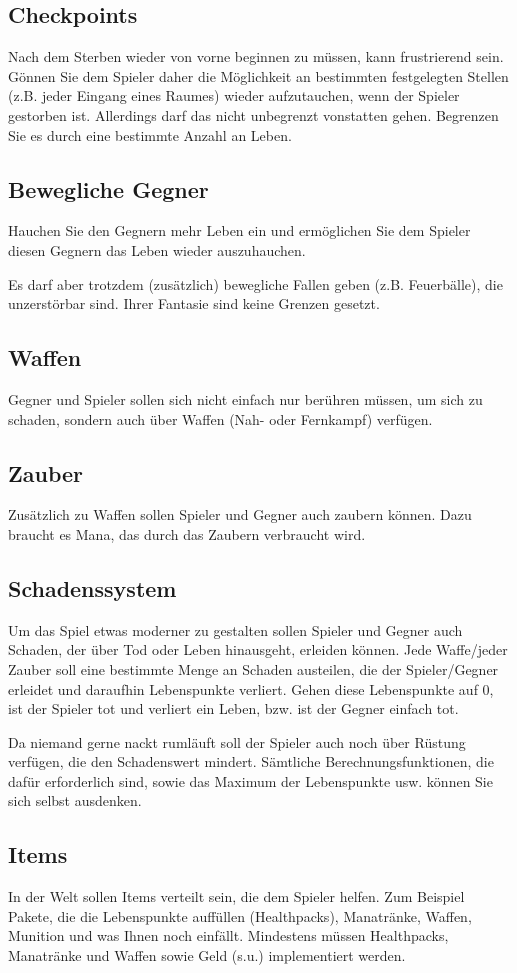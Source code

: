 \documentclass{programmierpraktikum}
\begin{document}
\subsection{Checkpoints}
Nach dem Sterben wieder von vorne beginnen zu müssen, kann frustrierend sein. Gönnen Sie dem Spieler
daher die Möglichkeit an bestimmten festgelegten Stellen (z.B. jeder Eingang eines Raumes) wieder
aufzutauchen, wenn der Spieler gestorben ist.  Allerdings darf das nicht unbegrenzt vonstatten gehen.
Begrenzen Sie es durch eine bestimmte Anzahl an Leben.
%
\subsection{Bewegliche Gegner}
Hauchen Sie den Gegnern mehr Leben ein und ermöglichen Sie dem Spieler diesen Gegnern das Leben
wieder auszuhauchen.

Es darf aber trotzdem (zusätzlich) bewegliche Fallen geben (z.B. Feuerbälle), die
unzerstörbar sind. Ihrer Fantasie sind keine Grenzen gesetzt.
%
\subsection{Waffen}
Gegner und Spieler sollen sich nicht einfach nur berühren müssen, um sich zu schaden, sondern auch
über Waffen (Nah- oder Fernkampf) verfügen.
%
\subsection{Zauber}
Zusätzlich zu Waffen sollen Spieler und Gegner auch zaubern können. Dazu braucht es Mana, das
durch das Zaubern verbraucht wird.
%
\subsection{Schadenssystem}
Um das Spiel etwas moderner zu gestalten sollen Spieler und Gegner auch Schaden, der über Tod oder
Leben hinausgeht, erleiden können. Jede Waffe/jeder Zauber soll eine bestimmte Menge an Schaden
austeilen, die der Spieler/Gegner erleidet und daraufhin Lebenspunkte verliert. Gehen diese Lebenspunkte
auf 0, ist der Spieler tot und verliert ein Leben, bzw. ist der Gegner einfach tot.

Da niemand gerne nackt rumläuft soll der Spieler auch noch über Rüstung verfügen, die den Schadenswert mindert.
Sämtliche Berechnungsfunktionen, die dafür erforderlich sind, sowie das Maximum der Lebenspunkte usw.
können Sie sich selbst ausdenken.
%
\subsection{Items}
In der Welt sollen Items verteilt sein, die dem Spieler helfen. Zum Beispiel Pakete, die die Lebenspunkte
auffüllen (Healthpacks), Manatränke, Waffen, Munition und was Ihnen noch einfällt. Mindestens müssen
Healthpacks, Manatränke und Waffen sowie Geld (s.u.) implementiert werden.
%
\end{document}
